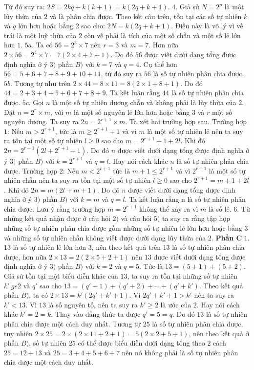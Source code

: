 \begin{multicols}{2}
	Từ đó suy ra: $2S=2kq+k(k+1)=k(2q+k+1)$. 
	\vskip 0.1cm
	$4.$ Giả sử $N=2^p$ là một lũy thừa của $2$ và là phân chia được. Theo kết câu trên, tồn tại các số tự nhiên $k$ và $q$ lớn hơn hoặc bằng $2$ sao cho: $2N=k(2q+k+1)$. Điều này là vô lý vì vế trái là một luỹ thừa của $2$ còn vế phải là tích của một số chẵn và một số lẻ lớn hơn $1$. 
	\vskip 0.1cm
	$5a.$ Ta có $56=2^3\times7$ nên $r=3$ và $m=7$. Hơn nữa $2\times 56=2^4\times7=7(2\times4+7+1)$. Do đó $56$ được viết dưới dạng tổng được định nghĩa ở ý $3)$ phần $B)$ với $k=7$ và $q=4$. Cụ thể hơn $56=5+6+7+8+9+10+11$, từ đó suy ra $56$ là số tự nhiên phân chia được. 
	\vskip 0.1cm
	$5b.$ Tương tự như trên $2\times 44=8\times11=8(2\times1+8+1)$. Do đó $44=2+3+4+5+6+7+8+9$. Ta kết luận rằng $44$ là số tự nhiên phân chia được.
	\vskip 0.1cm 
	$5c.$ Gọi $n$ là một số tự nhiên dương chẵn và không phải là lũy thừa của $2$. Đặt $n=2^r\times m$, với $m$ là một số nguyên lẻ lớn hơn hoặc bằng $3$ và $r$ một số nguyên dương. Ta suy ra $2n=2^{r+1}\times m$. Ta xét hai trường hợp sau. 
	\vskip 0.1cm
	Trường hợp $1$: Nếu $m>2^{r+1}$, tức là $m \ge 2^{r+1}+1$ và vì $m$ là một số tự nhiên lẻ nên ta suy ra tồn tại một số tự nhiên $l\ge 0$ sao cho $m=2^{r+1}+1+2l$. Khi đó $2n=2^{r+1}(2l+2^{r+1}+1)$. Do đó $n$ được viết dưới dạng tổng được định nghĩa ở ý $3)$ phần $B)$ với $k=2^{r+1}$ và $q=l$. Hay nói cách khác $n$ là số tự nhiên phân chia được. 
	\vskip 0.1cm
	Trường hợp $2$: Nếu $m<2^{r+1}$ tức là $m+1 \le 2^{r+1}$ và vì $2^{r+1}$ là một số tự nhiên chẵn nên ta suy ra tồn tại một số tự nhiên $l \ge 0$ sao cho $2^{r+1}=m+1+2l$. Khi đó $2n=m(2l+m+1)$. Do đó $n$ được viết dưới dạng tổng được định nghĩa ở ý $3)$ phần $B)$ với $k=m$ và $q=l$. Ta kết luận rằng n là số tự nhiên phân chia được.  
	\vskip 0.1cm
	Lưu ý rằng trường hợp $m=2^{r+1}$ không thể xảy ra vì $m$ là số lẻ. 
	\vskip 0.1cm
	$6.$ Từ những kết quả nhận được ở câu hỏi $2)$ và câu hỏi $5)$ ta suy ra rằng tập hợp những số tự nhiên phân chia được gồm những số tự nhiên lẻ lớn hơn hoặc bằng $3$ và những số tự nhiên chẵn không  viết được dưới dạng lũy thừa của $2$. 
	\vskip 0.1cm
	\textbf{\color{cackithi}Phần C}
	\vskip 0.1cm
	$1.$ $13$ là số tự nhiên lẻ lớn hơn $3$, nên theo kết quả trên $13$ là số tự nhiên phân chia được, hơn nữa $2\times 13=2(2\times 5+2+1)$ nên $13$ được viết dưới dạng tổng được định nghĩa ở ý $3)$ phần $B)$ với $k=2$ và $q=5$. Tức là $13=(5+1)+(5+2)$. Giả sử tồn tại một biểu diễn khác của $13$, ta suy ra tồn tại những số tự nhiên $k'\ ge 2$ và $q'$ sao cho $13=(q'+1)+(q'+2)+\cdots+(q'+k')$. Theo kết quả phần $B)$, ta có $2\times 13=k'(2q'+k'+1)$. Vì $2q'+k'+1>k'$ nên ta suy ra $k'<13$. Vì $13$ là số nguyên tố, nên ta suy ra $k'\ge 2$ là ước của $2$. Hay nói cách khác $k'=2=k$. Thay vào đẳng thức ta được $q'=5=q$. Do đó $13$ là số tự nhiên phân chia được một cách duy nhất. Tương tự $25$ là số tự nhiên phân chia được, tuy nhiên $2\times25=2\times(2\times11+2+1)=5(2\times2+5+1)$, nên theo kết quả ở phần $B)$, số tự nhiên $25$ có thể được biểu diễn dưới dạng tổng theo $2$ cách $25=12+13$ và $25=3+4+5+6+7$ nên nó không phải là số tự nhiên phân chia được một cách duy nhất.

\end{multicols}
